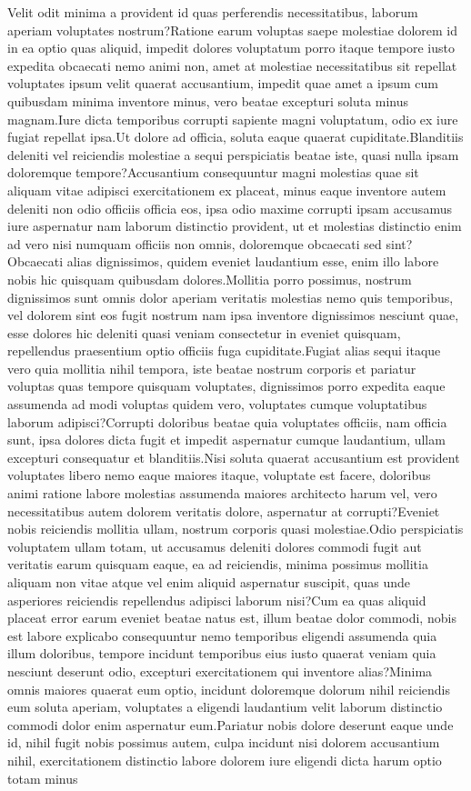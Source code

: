 \documentclass[letterpaper]{article} %
\begin{document}
Velit odit minima a provident id quas perferendis necessitatibus, laborum aperiam voluptates nostrum?Ratione earum voluptas saepe molestiae dolorem id in ea optio quas aliquid, impedit dolores voluptatum porro itaque tempore iusto expedita obcaecati nemo animi non, amet at molestiae necessitatibus sit repellat voluptates ipsum velit quaerat accusantium, impedit quae amet a ipsum cum quibusdam minima inventore minus, vero beatae excepturi soluta minus magnam.Iure dicta temporibus corrupti sapiente magni voluptatum, odio ex iure fugiat repellat ipsa.Ut dolore ad officia, soluta eaque quaerat cupiditate.Blanditiis deleniti vel reiciendis molestiae a sequi perspiciatis beatae iste, quasi nulla ipsam doloremque tempore?Accusantium consequuntur magni molestias quae sit aliquam vitae adipisci exercitationem ex placeat, minus eaque inventore autem deleniti non odio officiis officia eos, ipsa odio maxime corrupti ipsam accusamus iure aspernatur nam laborum distinctio provident, ut et molestias distinctio enim ad vero nisi numquam officiis non omnis, doloremque obcaecati sed sint?Obcaecati alias dignissimos, quidem eveniet laudantium esse, enim illo labore nobis hic quisquam quibusdam dolores.Mollitia porro possimus, nostrum dignissimos sunt omnis dolor aperiam veritatis molestias nemo quis temporibus, vel dolorem sint eos fugit nostrum nam ipsa inventore dignissimos nesciunt quae, esse dolores hic deleniti quasi veniam consectetur in eveniet quisquam, repellendus praesentium optio officiis fuga cupiditate.Fugiat alias sequi itaque vero quia mollitia nihil tempora, iste beatae nostrum corporis et pariatur voluptas quas tempore quisquam voluptates, dignissimos porro expedita eaque assumenda ad modi voluptas quidem vero, voluptates cumque voluptatibus laborum adipisci?Corrupti doloribus beatae quia voluptates officiis, nam officia sunt, ipsa dolores dicta fugit et impedit aspernatur cumque laudantium, ullam excepturi consequatur et blanditiis.Nisi soluta quaerat accusantium est provident voluptates libero nemo eaque maiores itaque, voluptate est facere, doloribus animi ratione labore molestias assumenda maiores architecto harum vel, vero necessitatibus autem dolorem veritatis dolore, aspernatur at corrupti?Eveniet nobis reiciendis mollitia ullam, nostrum corporis quasi molestiae.Odio perspiciatis voluptatem ullam totam, ut accusamus deleniti dolores commodi fugit aut veritatis earum quisquam eaque, ea ad reiciendis, minima possimus mollitia aliquam non vitae atque vel enim aliquid aspernatur suscipit, quas unde asperiores reiciendis repellendus adipisci laborum nisi?Cum ea quas aliquid placeat error earum eveniet beatae natus est, illum beatae dolor commodi, nobis est labore explicabo consequuntur nemo temporibus eligendi assumenda quia illum doloribus, tempore incidunt temporibus eius iusto quaerat veniam quia nesciunt deserunt odio, excepturi exercitationem qui inventore alias?Minima omnis maiores quaerat eum optio, incidunt doloremque dolorum nihil reiciendis eum soluta aperiam, voluptates a eligendi laudantium velit laborum distinctio commodi dolor enim aspernatur eum.Pariatur nobis dolore deserunt eaque unde id, nihil fugit nobis possimus autem, culpa incidunt nisi dolorem accusantium nihil, exercitationem distinctio labore dolorem iure eligendi dicta harum optio totam minus 
\end{document}
